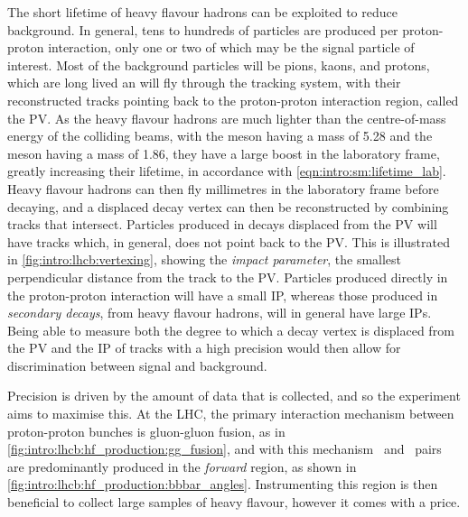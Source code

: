 The short lifetime of heavy flavour hadrons can be exploited to reduce 
background.
In general, tens to hundreds of particles are produced per proton-proton 
interaction, only one or two of which may be the signal particle of interest.
Most of the background particles will be pions, kaons, and protons, which are 
long lived an will fly through the tracking system, with their reconstructed 
tracks pointing back to the proton-proton interaction region, called the 
\ac{PV}.
As the heavy flavour hadrons are much lighter than the centre-of-mass energy of 
the colliding beams, with the \PBz meson having a mass of \SI{5.28}{\GeVcc} and 
the \PDz meson having a mass of \SI{1.86}{\GeVcc}, they have a large boost in 
the laboratory frame, greatly increasing their lifetime, in accordance with 
\cref{eqn:intro:sm:lifetime_lab}.
Heavy flavour hadrons can then fly millimetres in the laboratory frame before 
decaying, and a displaced decay vertex can then be reconstructed by combining 
tracks that intersect.
Particles produced in decays displaced from the \ac{PV} will have tracks which, 
in general, does not point back to the \ac{PV}.
This is illustrated in \cref{fig:intro:lhcb:vertexing}, showing the 
\emph{impact parameter}, the smallest perpendicular distance from the track to 
the \ac{PV}.
Particles produced directly in the proton-proton interaction will have a small 
\ac{IP}, whereas those produced in \emph{secondary decays}, from heavy flavour 
hadrons, will in general have large \acp{IP}.
Being able to measure both the degree to which a decay vertex is displaced from 
the \ac{PV} and the \acl{IP} of tracks with a high precision would then allow 
for discrimination between signal and background.

Precision is driven by the amount of data that is collected, and so the 
experiment aims to maximise this.
At the \ac{LHC}, the primary interaction mechanism between proton-proton 
bunches is gluon-gluon fusion, as in 
\cref{fig:intro:lhcb:hf_production:gg_fusion}, and with this mechanism \bbbar\ 
and \ccbar\ pairs are predominantly produced in the \emph{forward} region, as 
shown in \cref{fig:intro:lhcb:hf_production:bbbar_angles}.
Instrumenting this region is then beneficial to collect large samples of heavy 
flavour, however it comes with a price.

